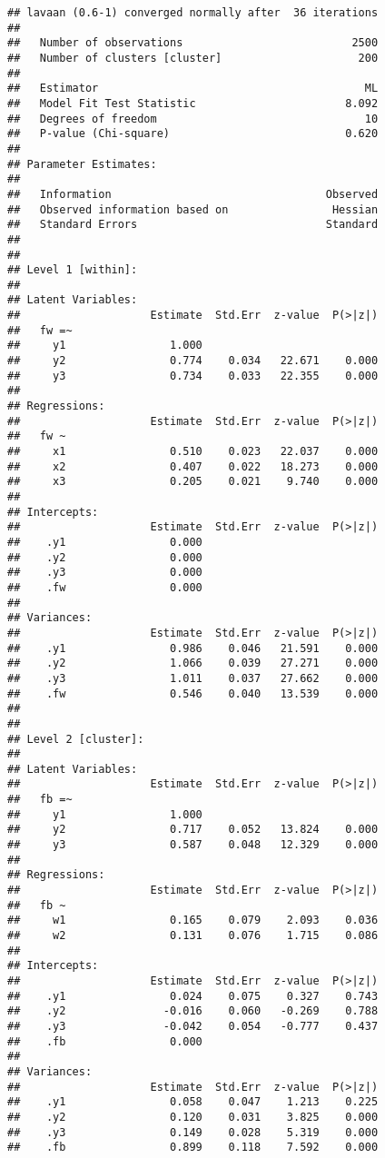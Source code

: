 \begin{verbatim}
## lavaan (0.6-1) converged normally after  36 iterations
## 
##   Number of observations                          2500
##   Number of clusters [cluster]                     200
## 
##   Estimator                                         ML
##   Model Fit Test Statistic                       8.092
##   Degrees of freedom                                10
##   P-value (Chi-square)                           0.620
## 
## Parameter Estimates:
## 
##   Information                                 Observed
##   Observed information based on                Hessian
##   Standard Errors                             Standard
## 
## 
## Level 1 [within]:
## 
## Latent Variables:
##                    Estimate  Std.Err  z-value  P(>|z|)
##   fw =~                                               
##     y1                1.000                           
##     y2                0.774    0.034   22.671    0.000
##     y3                0.734    0.033   22.355    0.000
## 
## Regressions:
##                    Estimate  Std.Err  z-value  P(>|z|)
##   fw ~                                                
##     x1                0.510    0.023   22.037    0.000
##     x2                0.407    0.022   18.273    0.000
##     x3                0.205    0.021    9.740    0.000
## 
## Intercepts:
##                    Estimate  Std.Err  z-value  P(>|z|)
##    .y1                0.000                           
##    .y2                0.000                           
##    .y3                0.000                           
##    .fw                0.000                           
## 
## Variances:
##                    Estimate  Std.Err  z-value  P(>|z|)
##    .y1                0.986    0.046   21.591    0.000
##    .y2                1.066    0.039   27.271    0.000
##    .y3                1.011    0.037   27.662    0.000
##    .fw                0.546    0.040   13.539    0.000
## 
## 
## Level 2 [cluster]:
## 
## Latent Variables:
##                    Estimate  Std.Err  z-value  P(>|z|)
##   fb =~                                               
##     y1                1.000                           
##     y2                0.717    0.052   13.824    0.000
##     y3                0.587    0.048   12.329    0.000
## 
## Regressions:
##                    Estimate  Std.Err  z-value  P(>|z|)
##   fb ~                                                
##     w1                0.165    0.079    2.093    0.036
##     w2                0.131    0.076    1.715    0.086
## 
## Intercepts:
##                    Estimate  Std.Err  z-value  P(>|z|)
##    .y1                0.024    0.075    0.327    0.743
##    .y2               -0.016    0.060   -0.269    0.788
##    .y3               -0.042    0.054   -0.777    0.437
##    .fb                0.000                           
## 
## Variances:
##                    Estimate  Std.Err  z-value  P(>|z|)
##    .y1                0.058    0.047    1.213    0.225
##    .y2                0.120    0.031    3.825    0.000
##    .y3                0.149    0.028    5.319    0.000
##    .fb                0.899    0.118    7.592    0.000
\end{verbatim}


